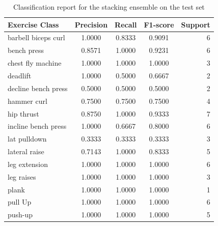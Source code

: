 \begin{table}[!h]
\centering
\caption{Classification report for the stacking ensemble on the test set}
\label{tab:stacking-report}
\begin{tabular}{l c c c r}
\hline
\textbf{Exercise Class}   & \textbf{Precision} & \textbf{Recall} & \textbf{F1-score} & \textbf{Support} \\
\hline
barbell biceps curl       & 1.0000             & 0.8333          & 0.9091            & 6                \\
bench press               & 0.8571             & 1.0000          & 0.9231            & 6                \\
chest fly machine         & 1.0000             & 1.0000          & 1.0000            & 3                \\
deadlift                  & 1.0000             & 0.5000          & 0.6667            & 2                \\
decline bench press       & 0.5000             & 0.5000          & 0.5000            & 2                \\
hammer curl               & 0.7500             & 0.7500          & 0.7500            & 4                \\
hip thrust                & 0.8750             & 1.0000          & 0.9333            & 7                \\
incline bench press       & 1.0000             & 0.6667          & 0.8000            & 6                \\
lat pulldown              & 0.3333             & 0.3333          & 0.3333            & 3                \\
lateral raise             & 0.7143             & 1.0000          & 0.8333            & 5                \\
leg extension             & 1.0000             & 1.0000          & 1.0000            & 6                \\
leg raises                & 1.0000             & 1.0000          & 1.0000            & 3                \\
plank                     & 1.0000             & 1.0000          & 1.0000            & 1                \\
pull Up                   & 1.0000             & 1.0000          & 1.0000            & 6                \\
push-up                   & 1.0000             & 1.0000          & 1.0000            & 5                \\

\end{tabular}
\end{table}
